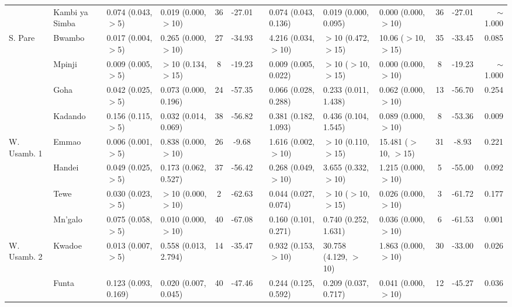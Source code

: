 \begin{tabular}{llllccclllccr}
            & Kambi ya Simba & 0.074 (0.043, $>$5)   & 0.019 (0.000, $>$10)   & 36  & -27.01  & & 0.074  (0.043, 0.136)   & 0.019  (0.000, 0.095)   & 0.000  (0.000, $>$10)   & 36  & -27.01   & $\sim$1.000\\
\cmidrule{2-13}
S. Pare     & Bwambo         & 0.017 (0.004, $>$5)   & 0.265 (0.000, $>$10)   & 27  & -34.93  & & 4.216  (0.034, $>$10)   & $>$10  (0.472, $>$15)   & 10.06  ($>$10, $>$15)   & 35  & -33.45   & 0.085\\
            & Mpinji         & 0.009 (0.005, $>$5)   & $>$10 (0.134, $>$15)   & 8   & -19.23  & & 0.009  (0.005, 0.022)   & $>$10  ($>$10, $>$15)   & 0.000  (0.000, $>$10)   & 8   & -19.23   & $\sim$1.000\\
            & Goha           & 0.042 (0.025, $>$5)   & 0.073 (0.000, 0.196)   & 24  & -57.35  & & 0.066  (0.028, 0.288)   & 0.233  (0.011, 1.438)   & 0.062  (0.000, $>$10)   & 13  & -56.70   & 0.254\\
            & Kadando        & 0.156 (0.115, $>$5)   & 0.032 (0.014, 0.069)   & 38  & -56.82  & & 0.381  (0.182, 1.093)   & 0.436  (0.104, 1.545)   & 0.089  (0.000, $>$10)   & 8   & -53.36   & 0.009\\
\cmidrule{2-13}
W. Usamb. 1 & Emmao          & 0.006 (0.001, $>$5)   & 0.838 (0.000, $>$10)   & 26  & -9.68   & & 1.616  (0.002, $>$10)   & $>$10  (0.110, $>$15)   & 15.481 ($>$10, $>$15)   & 31  & -8.93    & 0.221\\
            & Handei         & 0.049 (0.025, $>$5)   & 0.173 (0.062, 0.527)   & 37  & -56.42  & & 0.268  (0.049, $>$10)   & 3.655  (0.332, $>$10)   & 1.215  (0.000, $>$10)   & 5   & -55.00   & 0.092\\
            & Tewe           & 0.030 (0.023, $>$5)   & $>$10 (0.000, $>$10)   & 2   & -62.63  & & 0.044  (0.027, 0.074)   & $>$10  ($>$10, $>$15)   & 0.026  (0.000, $>$10)   & 3   & -61.72   & 0.177\\
            & Mn'galo        & 0.075 (0.058, $>$5)   & 0.010 (0.000, $>$10)   & 40  & -67.08  & & 0.160  (0.101, 0.271)   & 0.740  (0.252, 1.631)   & 0.036  (0.000, $>$10)   & 6   & -61.53   & 0.001\\
\cmidrule{2-13}
W. Usamb. 2 & Kwadoe         & 0.013 (0.007, $>$5)   & 0.558 (0.013, 2.794)   & 14  & -35.47  & & 0.932  (0.153, $>$10)   & 30.758 (4.129, $>$10)   & 1.863  (0.000, $>$10)   & 30  & -33.00   & 0.026\\
            & Funta          & 0.123 (0.093, 0.169)  & 0.020 (0.007, 0.045)   & 40  & -47.46  & & 0.244  (0.125, 0.592)   & 0.209  (0.037, 0.717)   & 0.041  (0.000, $>$10)   & 12  & -45.27   & 0.036\\

\end{tabular}
